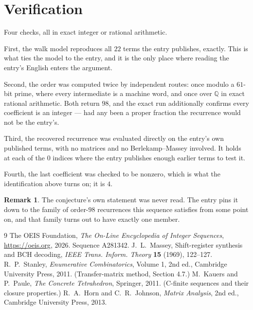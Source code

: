 \documentclass[11pt,a4paper]{article}
\theoremstyle{plain}
\theoremstyle{definition}
\newtheorem{remark}[theorem]{Remark}
\begin{document}
\section{Verification}

Four checks, all in exact integer or rational arithmetic.

First, the walk model reproduces all $22$ terms the entry publishes, exactly. This is
what ties the model to the entry, and it is the only place where reading the entry's English
enters the argument.

Second, the order was computed twice by independent routes: once modulo a $61$-bit prime, where
every intermediate is a machine word, and once over $\mathbb{Q}$ in exact rational arithmetic.
Both return $98$, and the exact run additionally confirms every coefficient is an integer
--- had any been a proper fraction the recurrence would not be the entry's.

Third, the recovered recurrence was evaluated directly on the entry's own published terms, with
no matrices and no Berlekamp--Massey involved. It holds at each of the $0$ indices where
the entry publishes enough earlier terms to test it.

Fourth, the last coefficient was checked to be nonzero, which is what the identification above
turns on; it is $4$.

\begin{remark}
The conjecture's own statement was never read. The entry pins it down to the family of
order-$98$ recurrences this sequence satisfies from some point on, and that family turns
out to have exactly one member.
\end{remark}

\begin{thebibliography}{9}
 The OEIS Foundation, \emph{The On-Line Encyclopedia of Integer
Sequences}, \url{https://oeis.org}, 2026. Sequence A281342.
 J.~L.~Massey, Shift-register synthesis and BCH decoding, \emph{IEEE
Trans. Inform. Theory} \textbf{15} (1969), 122--127.
 R.~P.~Stanley, \emph{Enumerative Combinatorics}, Volume 1, 2nd ed.,
Cambridge University Press, 2011. (Transfer-matrix method, Section 4.7.)
 M.~Kauers and P.~Paule, \emph{The Concrete Tetrahedron}, Springer, 2011.
(C-finite sequences and their closure properties.)
 R.~A.~Horn and C.~R.~Johnson, \emph{Matrix Analysis}, 2nd ed., Cambridge
University Press, 2013.
\end{thebibliography}
\end{document}
